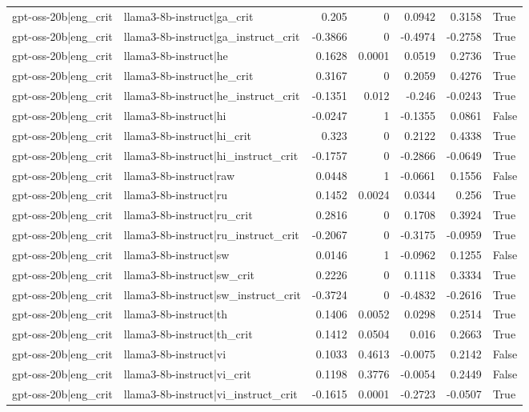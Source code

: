 \begin{table}
\begin{tabular}{l l r r r r l}
gpt-oss-20b|eng_crit & llama3-8b-instruct|ga_crit & 0.205 & 0 & 0.0942 & 0.3158 & True \\
gpt-oss-20b|eng_crit & llama3-8b-instruct|ga_instruct_crit & -0.3866 & 0 & -0.4974 & -0.2758 & True \\
gpt-oss-20b|eng_crit & llama3-8b-instruct|he & 0.1628 & 0.0001 & 0.0519 & 0.2736 & True \\
gpt-oss-20b|eng_crit & llama3-8b-instruct|he_crit & 0.3167 & 0 & 0.2059 & 0.4276 & True \\
gpt-oss-20b|eng_crit & llama3-8b-instruct|he_instruct_crit & -0.1351 & 0.012 & -0.246 & -0.0243 & True \\
gpt-oss-20b|eng_crit & llama3-8b-instruct|hi & -0.0247 & 1 & -0.1355 & 0.0861 & False \\
gpt-oss-20b|eng_crit & llama3-8b-instruct|hi_crit & 0.323 & 0 & 0.2122 & 0.4338 & True \\
gpt-oss-20b|eng_crit & llama3-8b-instruct|hi_instruct_crit & -0.1757 & 0 & -0.2866 & -0.0649 & True \\
gpt-oss-20b|eng_crit & llama3-8b-instruct|raw & 0.0448 & 1 & -0.0661 & 0.1556 & False \\
gpt-oss-20b|eng_crit & llama3-8b-instruct|ru & 0.1452 & 0.0024 & 0.0344 & 0.256 & True \\
gpt-oss-20b|eng_crit & llama3-8b-instruct|ru_crit & 0.2816 & 0 & 0.1708 & 0.3924 & True \\
gpt-oss-20b|eng_crit & llama3-8b-instruct|ru_instruct_crit & -0.2067 & 0 & -0.3175 & -0.0959 & True \\
gpt-oss-20b|eng_crit & llama3-8b-instruct|sw & 0.0146 & 1 & -0.0962 & 0.1255 & False \\
gpt-oss-20b|eng_crit & llama3-8b-instruct|sw_crit & 0.2226 & 0 & 0.1118 & 0.3334 & True \\
gpt-oss-20b|eng_crit & llama3-8b-instruct|sw_instruct_crit & -0.3724 & 0 & -0.4832 & -0.2616 & True \\
gpt-oss-20b|eng_crit & llama3-8b-instruct|th & 0.1406 & 0.0052 & 0.0298 & 0.2514 & True \\
gpt-oss-20b|eng_crit & llama3-8b-instruct|th_crit & 0.1412 & 0.0504 & 0.016 & 0.2663 & True \\
gpt-oss-20b|eng_crit & llama3-8b-instruct|vi & 0.1033 & 0.4613 & -0.0075 & 0.2142 & False \\
gpt-oss-20b|eng_crit & llama3-8b-instruct|vi_crit & 0.1198 & 0.3776 & -0.0054 & 0.2449 & False \\
gpt-oss-20b|eng_crit & llama3-8b-instruct|vi_instruct_crit & -0.1615 & 0.0001 & -0.2723 & -0.0507 & True \\

\end{tabular}
\end{table}
